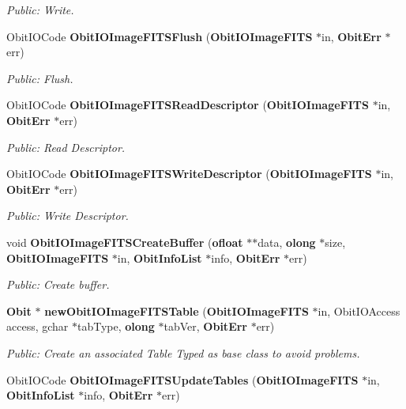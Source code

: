 \begin{CompactItemize}
\begin{CompactList}\small\item\em Public: Write. \item\end{CompactList}\item 
Obit\-IOCode {\bf Obit\-IOImage\-FITSFlush} ({\bf Obit\-IOImage\-FITS} $\ast$in, {\bf Obit\-Err} $\ast$err)
\begin{CompactList}\small\item\em Public: Flush. \item\end{CompactList}\item 
Obit\-IOCode {\bf Obit\-IOImage\-FITSRead\-Descriptor} ({\bf Obit\-IOImage\-FITS} $\ast$in, {\bf Obit\-Err} $\ast$err)
\begin{CompactList}\small\item\em Public: Read Descriptor. \item\end{CompactList}\item 
Obit\-IOCode {\bf Obit\-IOImage\-FITSWrite\-Descriptor} ({\bf Obit\-IOImage\-FITS} $\ast$in, {\bf Obit\-Err} $\ast$err)
\begin{CompactList}\small\item\em Public: Write Descriptor. \item\end{CompactList}\item 
void {\bf Obit\-IOImage\-FITSCreate\-Buffer} ({\bf ofloat} $\ast$$\ast$data, {\bf olong} $\ast$size, {\bf Obit\-IOImage\-FITS} $\ast$in, {\bf Obit\-Info\-List} $\ast$info, {\bf Obit\-Err} $\ast$err)
\begin{CompactList}\small\item\em Public: Create buffer. \item\end{CompactList}\item 
{\bf Obit} $\ast$ {\bf new\-Obit\-IOImage\-FITSTable} ({\bf Obit\-IOImage\-FITS} $\ast$in, Obit\-IOAccess access, gchar $\ast$tab\-Type, {\bf olong} $\ast$tab\-Ver, {\bf Obit\-Err} $\ast$err)
\begin{CompactList}\small\item\em Public: Create an associated Table Typed as base class to avoid problems. \item\end{CompactList}\item 
Obit\-IOCode {\bf Obit\-IOImage\-FITSUpdate\-Tables} ({\bf Obit\-IOImage\-FITS} $\ast$in, {\bf Obit\-Info\-List} $\ast$info, {\bf Obit\-Err} $\ast$err)
$$
\end{CompactItemize}
